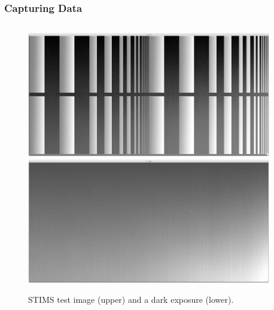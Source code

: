 \documentclass[landscape,xcolor={table},10pt]{beamer}
\begin{document}
	\begin{frame}
		
		\frametitle{Capturing Data}
		
		\begin{columns}[T] %
		\begin{column}{.49\textwidth}
	
			\begin{figure}
				\centering
				\includegraphics[width=\textwidth]{images/stim_minus} \\
				\includegraphics[width=\textwidth]{images/dark_minus}
				\caption{STIMS test image (upper) and a dark exposure (lower).}
			\end{figure}

			
		\end{column}%
		\hfill%
		\begin{column}{.50\textwidth}
		
			\begin{itemize}


\end{itemize}
\end{column}
\end{columns}
\end{frame}
\end{document}
